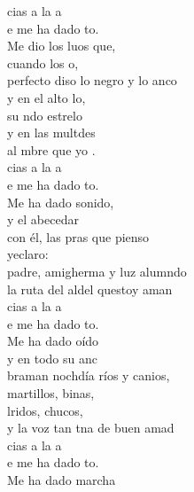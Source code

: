 \begin{cancion}%
	cias a la a \\
	e me ha dado to.\\
	Me dio los luos que, \\
	cuando los o,\\
	perfecto diso lo negro y lo anco\\
	y en el alto lo, \\
	su ndo estrelo\\
	y en las multdes\\
	al mbre que yo .\\
	cias a la a \\
	e me ha dado to.\\
	Me ha dado sonido, \\
	y el abecedar\\
	con él, las pras que pienso \\
	yeclaro:\\
	padre, amigherma y luz alumndo\\
	la ruta del aldel questoy aman\\
	cias a la a \\
	e me ha dado to.\\
	Me ha dado oído\\
	y en todo su anc\\
	braman nochdía ríos y canios,\\
	martillos, binas, \\
	lridos, chucos,\\
	y la voz tan tna de  buen amad\\
	cias a la a \\
	e me ha dado to.\\
	Me ha dado marcha \\

\end{cancion}
